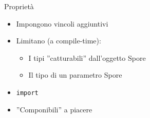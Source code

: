 \begin{frame}{Proprietà}
	\begin{itemize}
		\item Impongono vincoli aggiuntivi 
		\item Limitano (a compile-time):
		\begin{itemize}
			\item I tipi ''catturabili'' dall'oggetto Spore
			\item Il tipo di un parametro Spore
		\end{itemize}
		\item \texttt{import}
		\item ''Componibili'' a piacere 
	\end{itemize}
\end{frame}